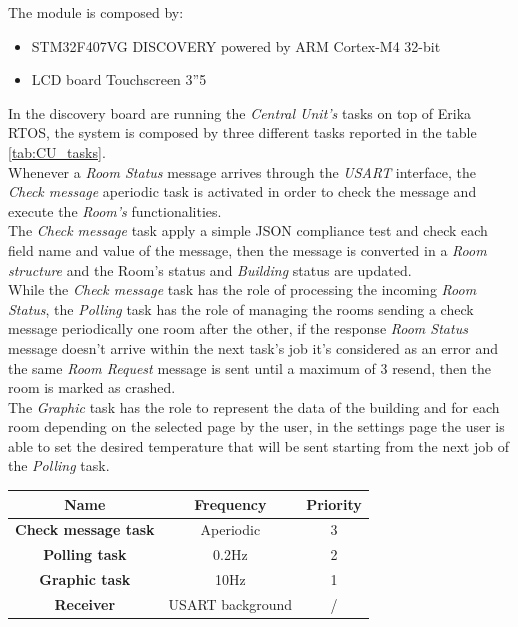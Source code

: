 The module is composed by:
\begin{itemize}
	\item STM32F407VG DISCOVERY powered by ARM Cortex-M4 32-bit
	\item LCD board Touchscreen 3”5
\end{itemize}
In the discovery board are running the \textit{Central Unit's} tasks on top of Erika RTOS, the system is composed by three different tasks reported in the table \ref{tab:CU_tasks}.\\
Whenever a \textit{Room Status} message arrives through the \textit{USART} interface, the \textit{Check message} aperiodic task is activated in order to check the message and execute the \textit{Room's} functionalities.\\
The \textit{Check  message} task apply a simple JSON compliance test and check each field name and value of the message, then the message is converted in a \textit{Room structure} and the Room's status and \textit{Building} status are updated.\\
While the \textit{Check message} task has the role of processing the incoming \textit{Room Status}, the \textit{Polling} task has the role of managing the rooms sending a check message periodically one room after the other, 
if the response \textit{Room Status} message doesn't arrive within the next task's job it's considered as an error and the same \textit{Room Request} message is sent until a maximum of 3 resend, then the room is marked as crashed.\\
The \textit{Graphic} task has the role to represent the data of the building and for each room depending on the selected page by the user, in the settings page the user is able to set the desired temperature that will be sent starting from the next job of the \textit{Polling} task.\\
\begin{center}
	\begin{tabular}{||c | c | c ||} 
		\hline
		Name 	& Frequency & Priority	\\ 
		\hline
		\textbf{Check message task}	&	Aperiodic		& 3 	\\ 
		\hline
		\textbf{Polling task}		&	0.2Hz			& 2 	\\ 
		\hline
		\textbf{Graphic task}		&	10Hz			& 1 	\\ 
		\hline
		\textbf{Receiver}			&	USART background		& / 	\\ 
		\hline
	\end{tabular}
\end{center}
